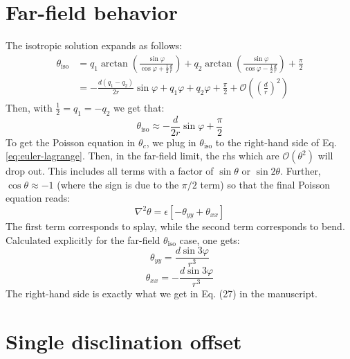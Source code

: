 \documentclass[reqno]{article}
\begin{document}
\section{Far-field behavior}

The isotropic solution expands as follows:
\begin{equation}
\begin{split}
    \theta_\text{iso}
    &=
    q_1 \arctan\left(\frac{\sin\varphi}{\cos\varphi + \tfrac12 \tfrac{d}{r}}\right)
    + q_2 \arctan\left(\frac{\sin\varphi}{\cos\varphi - \tfrac12 \tfrac{d}{r}}\right)
    + \frac{\pi}{2} \\
    &=
    -\frac{d (q_1 - q_2)}{2r} \sin \varphi
    + q_1 \varphi + q_2 \varphi
    + \frac{\pi}{2}
    + \mathcal{O} \left( \left(\frac{d}{r}\right)^2 \right)
\end{split}
\end{equation}
Then, with $\tfrac12 = q_1 = -q_2$ we get that:
\begin{equation}
    \theta_\text{iso}
    \approx
    -\frac{d}{2r} \sin\varphi + \frac{\pi}{2}
\end{equation}
To get the Poisson equation in $\theta_c$, we plug in $\theta_\text{iso}$ to the right-hand side of Eq. \eqref{eq:euler-lagrange}.
Then, in the far-field limit, the rhs which are $\mathcal{O}(\theta^2)$ will drop out.
This includes all terms with a factor of $\sin\theta$ or $\sin 2\theta$.
Further, $\cos\theta \approx -1$ (where the sign is due to the $\pi / 2$ term) so that the final Poisson equation reads:
\begin{equation}
    \nabla^2 \theta
    =
    \epsilon \left[
        -\theta_{yy} + \theta_{xx}
    \right]
\end{equation}
The first term corresponds to splay, while the second term corresponds to bend.
Calculated explicitly for the far-field $\theta_\text{iso}$ case, one gets:
\begin{equation}
    \theta_{yy}
    =
    \frac{d \sin 3\varphi}{r^3}
\end{equation}
\begin{equation}
    \theta_{xx}
    =
    -\frac{d \sin3\varphi}{r^3}
\end{equation}
The right-hand side is exactly what we get in Eq. (27) in the manuscript.

\section{Single disclination offset}
\end{document}
